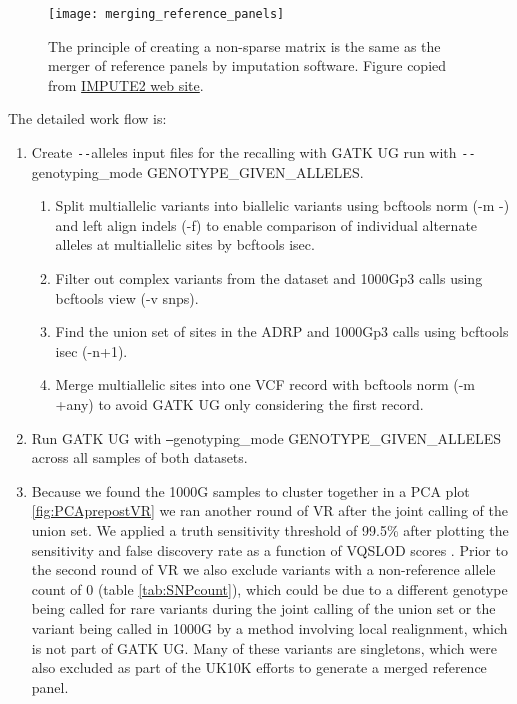 \begin{figure}[htbp]
\centering
\texttt{[image: merging\_reference\_panels]}
\caption[Illustration of the principle of creation of a non-sparse matrix of SNPs across all samples.]{The principle of creating a non-sparse matrix is the same as the merger of reference panels by imputation software. Figure copied from \href{http://mathgen.stats.ox.ac.uk/impute/merging\_reference\_panels.png}{IMPUTE2 web site}.}
\label{fig:merging_reference_panels}
\end{figure}

The detailed work flow is:
\begin{enumerate}
\item{Create \texttt{-{}-}alleles input files for the recalling with \gls{GATK} \gls{UG} run with \texttt{-{}-}genotyping\_mode GENOTYPE\_GIVEN\_ALLELES.}

\begin{enumerate}

\item{Split multiallelic variants into biallelic variants using bcftools norm (-m -) and left align indels (-f) to enable comparison of individual alternate alleles at multiallelic sites by bcftools isec.}

\item{Filter out complex variants from the dataset and 1000Gp3 calls using bcftools view (-v snps).}

\item{Find the union set of sites in the ADRP and 1000Gp3 calls using bcftools isec (-n+1).}

\item{Merge multiallelic sites into one VCF record with bcftools norm (-m +any) to avoid GATK UG only considering the first record.}

\end{enumerate}

\item{Run \gls{GATK} \gls{UG} with \texttt{--}genotyping\_mode GENOTYPE\_GIVEN\_ALLELES across all samples of both datasets.}

\item{Because we found the 1000G samples to cluster together in a PCA plot \ref{fig:PCAprepostVR} we ran another round of \gls{VR} after the joint calling of the union set. We applied a truth sensitivity threshold of 99.5\% after plotting the sensitivity and false discovery rate as a function of VQSLOD scores
. Prior to the second round of \gls{VR} we also exclude variants with a non-reference allele count of 0 (table \ref{tab:SNPcount}), which could be due to a different genotype being called for rare variants during the joint calling of the union set or the variant being called in 1000G by a method involving local realignment, which is not part of \gls{GATK} \gls{UG}. Many of these variants are singletons, which were also excluded as part of the UK10K efforts to generate a merged reference panel.\cite{2015Huang}}


\end{enumerate}
